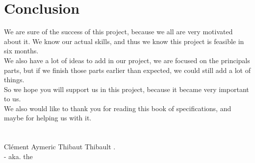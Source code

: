 \chapter*{Conclusion}

		We are sure of the success of this project, because we all are very motivated about it.
		We know our actual skills, and thus we know this project is feasible in six months.
		\\
		We also have a lot of ideas to add in our project, we are focused on the principals parts,
		but if we finish those parts earlier than expected, we could still add a lot of things.
		\\
		So we hope you will support us in this project, because it became very important to us.
		\\
		We also would like to thank you for reading this book of specifications, and maybe for helping us with it.
		\\\\\\
		\phantom{} \hfill Clément  Aymeric  Thibaut  Thibault .
		\\
		\phantom{} \hfill - aka. the 
		

